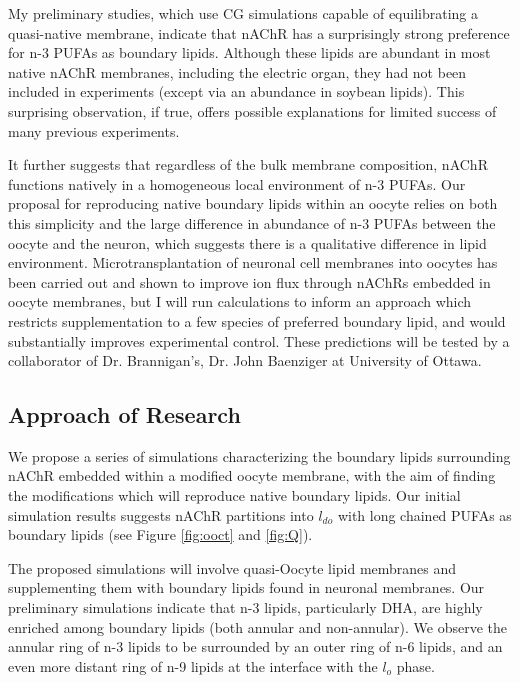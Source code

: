 \documentclass{article}
\begin{document}
My preliminary studies, which use CG simulations capable of equilibrating a quasi-native membrane, indicate that nAChR has a surprisingly strong preference for n-3 PUFAs as boundary lipids. Although these lipids are abundant in most native nAChR membranes, including the electric organ, they had not been included in experiments (except via an abundance in soybean lipids). This surprising observation, if true, offers possible explanations for limited success of many previous experiments.

It further suggests that regardless of the bulk membrane composition, nAChR functions natively in a homogeneous local environment of n-3 PUFAs. Our proposal for reproducing native boundary lipids within an oocyte relies on both this simplicity and the large difference in abundance of n-3 PUFAs between the oocyte and the neuron, which suggests there is a qualitative difference in lipid environment. Microtransplantation of neuronal cell membranes into oocytes \cite{Conti2013} has been carried out and shown to improve ion flux through nAChRs embedded in oocyte membranes, but I will run calculations to inform an approach which restricts supplementation to a few species of preferred boundary lipid, and would substantially improves experimental control. These predictions will be tested by a collaborator of Dr. Brannigan’s, Dr. John Baenziger at University of Ottawa.

\subsection{Approach of Research}

We propose a series of simulations characterizing the boundary lipids surrounding nAChR embedded within a modified oocyte membrane, with the aim of finding the modifications which will reproduce native boundary lipids. Our initial simulation results suggests nAChR partitions into $l_{do}$ with long chained PUFAs as boundary lipids (see Figure \ref{fig:ooct} and \ref{fig:Q}).

The proposed simulations will involve quasi-Oocyte lipid membranes and supplementing them with boundary lipids found in neuronal membranes. Our preliminary simulations indicate that n-3 lipids, particularly DHA, are highly enriched among boundary lipids (both annular and non-annular). We observe the annular ring of n-3 lipids to be surrounded by an outer ring of n-6 lipids, and an even more distant ring of n-9 lipids at the interface with the $l_o$ phase.
\end{document}
